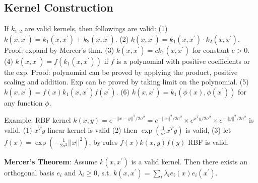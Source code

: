\subsection*{Kernel Construction}
If $k_{1,2}$ are valid kernels, then followings are valid: (1) $k(x, x^\prime) = k_1(x, x^\prime) + k_2(x, x^\prime)$. (2) $k(x, x^\prime) = k_1(x, x^\prime)\cdot k_2(x, x^\prime)$. Proof: expand by Mercer's thm. (3) $k(x, x^\prime) = c k_1(x, x^\prime)$ for constant $c>0$. (4) $k(x, x^\prime) = f(k_1(x, x^\prime))$ if $f$ is a polynomial with positive coefficients or the exp. Proof: polynomial can be proved by applying the product, positive scaling and addition. Exp can be proved by taking limit on the polynomial. (5) $k(x, x^\prime) = f(x) k_1(x, x^\prime) f(x^\prime)$. (6) $k(x, x^\prime) = k_1(\phi(x), \phi(x^\prime))$ for any function $\phi$.


Example: RBF kernel $k(x,y) = e^{-||x-y||^2/2\sigma^2} = e^{-||x||^2/2\sigma^2}\times e^{x^T y/2\sigma^2} \times e^{-||y||^2/2\sigma^2}$ is valid. (1) $x^T y$ linear kernel is valid (2) then $\exp(\frac{1}{\sigma^2}x^T y)$ is valid, (3) let $f(x) = \exp(-\frac{1}{2\sigma^2} ||x||^2)$, by rules $f(x) k(x, y) f(y)$ RBF is valid.

\textbf{Mercer's Theorem}: Assume $k(x, x^\prime)$ is a valid kernel. Then there exists an orthogonal basis $e_i$ and $\lambda_i\ge 0$, s.t. $k(x, x^\prime) = \sum_{i} \lambda_i e_i(x) e_i(x^\prime)$.


